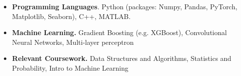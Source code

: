 

\begin{cvparagraph}

\begin{itemize}[leftmargin=*]
    \item \textbf{Programming Languages}. Python (packages: Numpy, Pandas, PyTorch, Matplotlib, Seaborn), C++, MATLAB.
    \item \textbf{Machine Learning.} Gradient Boosting (e.g. XGBoost), Convolutional Neural Networks, Multi-layer perceptron
    \item \textbf{Relevant Coursework.} Data Structures and Algorithms, Statistics and Probability, Intro to Machine Learning
\end{itemize}

\end{cvparagraph}
